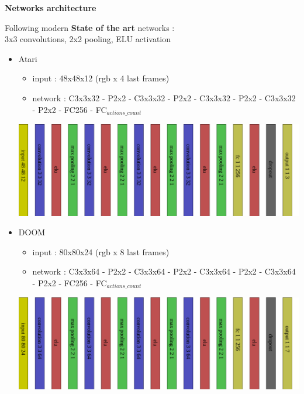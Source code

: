 \documentclass[xcolor=dvipsnames]{beamer}
\begin{document}
\begin{frame}{\bf Networks architecture}

Following modern {\bf State of the art} networks :\\ 3x3 convolutions, 2x2 pooling, ELU activation

{\footnotesize
    \begin{itemize}
        \item Atari
            \begin{itemize}
                \item input : 48x48x12 (rgb x 4 last frames)
                \item network : C3x3x32 - P2x2 - C3x3x32 - P2x2 - C3x3x32 - P2x2 - C3x3x32 - P2x2 - FC256 - FC$_{actions\_count}$
            \end{itemize}
            \includegraphics[scale=0.05]{../../diagrams/rl/atari_network.png}

        \item DOOM
            \begin{itemize}
                \item input : 80x80x24 (rgb x 8 last frames)
                \item network : C3x3x64 - P2x2 - C3x3x64 - P2x2 - C3x3x64 - P2x2 - C3x3x64 - P2x2 - FC256 - FC$_{actions\_count}$
            \end{itemize}
            \includegraphics[scale=0.05]{../../diagrams/rl/doom_network.png}

    \end{itemize}
}

\end{frame}
\end{document}
